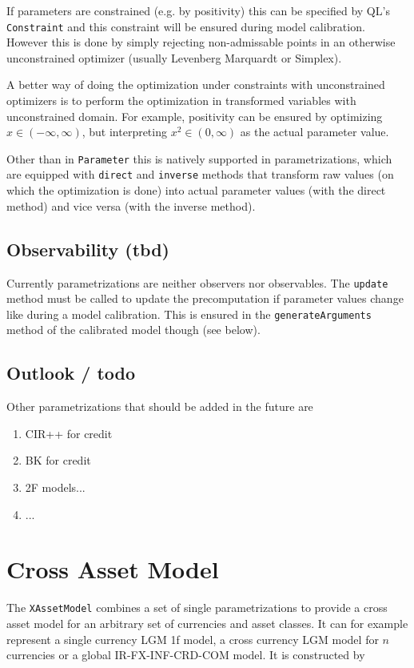\documentclass[12pt, a4paper]{article}
\begin{document}
If parameters are constrained (e.g. by positivity) this can be specified by QL's \verb+Constraint+ and this constraint will be ensured during model calibration. However this is done by simply rejecting non-admissable points in an otherwise unconstrained optimizer (usually Levenberg Marquardt or Simplex).

A better way of doing the optimization under constraints with unconstrained optimizers is to perform the optimization in transformed variables with unconstrained domain. For example, positivity can be ensured by optimizing $x\in(-\infty,\infty)$, but interpreting $x^2\in(0,\infty)$ as the actual parameter value.

Other than in \verb+Parameter+ this is natively supported in parametrizations, which are equipped with \verb+direct+ and \verb+inverse+ methods that transform raw values (on which the optimization is done) into actual parameter values (with the direct method) and vice versa (with the inverse method).

\subsection{Observability (tbd)}

Currently parametrizations are neither observers nor observables. The \verb+update+ method must be called to update the precomputation if parameter values change like during a model calibration. This is ensured in the \verb+generateArguments+ method of the calibrated model though (see below).

\subsection{Outlook / todo}

Other parametrizations that should be added in the future are

\begin{enumerate}
\item CIR++ for credit
\item BK for credit
\item 2F models...
\item ...
\end{enumerate}

\section{Cross Asset Model}

The \verb+XAssetModel+ combines a set of single parametrizations to provide a cross asset model for an arbitrary set of currencies and asset classes. It can for example represent a single currency LGM 1f model, a cross currency LGM model for $n$ currencies or a global IR-FX-INF-CRD-COM model. It is constructed by
\end{document}
